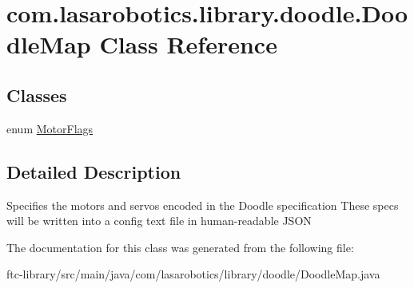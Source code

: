 \hypertarget{classcom_1_1lasarobotics_1_1library_1_1doodle_1_1_doodle_map}{}\section{com.\+lasarobotics.\+library.\+doodle.\+Doodle\+Map Class Reference}
\label{classcom_1_1lasarobotics_1_1library_1_1doodle_1_1_doodle_map}
\subsection*{Classes}
\begin{DoxyCompactItemize}
\item 
enum \hyperlink{enumcom_1_1lasarobotics_1_1library_1_1doodle_1_1_doodle_map_1_1_motor_flags}{Motor\+Flags}
\end{DoxyCompactItemize}


\subsection{Detailed Description}
Specifies the motors and servos encoded in the Doodle specification These specs will be written into a config text file in human-\/readable J\+S\+O\+N 

The documentation for this class was generated from the following file\+:\begin{DoxyCompactItemize}
\item 
ftc-\/library/src/main/java/com/lasarobotics/library/doodle/Doodle\+Map.\+java\end{DoxyCompactItemize}
